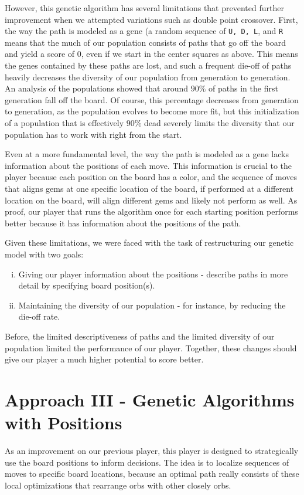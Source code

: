 \documentclass[journal,final,letterpaper,11pt]{IEEEtran}
\begin{document}
However, this genetic algorithm has several limitations that prevented further improvement when we attempted variations such as double point crossover. First, the way the path is modeled as a gene (a random sequence of \verb+U, D, L+, and \verb+R+ means that the much of our population consists of paths that go off the board and yield a score of 0, even if we start in the center squares as above. This means the genes contained by these paths are lost, and such a frequent die-off of paths heavily decreases the diversity of our population from generation to generation. An analysis of the populations showed that around $90\%$ of paths in the first generation fall off the board. Of course, this percentage decreases from generation to generation, as the population evolves to become more fit, but this initialization of a population that is effectively $90\%$ dead severely limits the diversity that our population has to work with right from the start.

Even at a more fundamental level, the way the path is modeled as a gene lacks information about the positions of each move. This information is crucial to the player because each position on the board has a color, and the sequence of moves that aligns gems at one specific location of the board, if performed at a different location on the board, will align different gems and likely not perform as well. As proof, our player that runs the algorithm once for each starting position performs better because it has information about the positions of the path. 

Given these limitations, we were faced with the task of restructuring our genetic model with two goals:
\begin{enumerate}[(i)]
\item Giving our player information about the positions - describe paths in more detail by specifying board position(s).
\item Maintaining the diversity of our population - for instance, by reducing the die-off rate.
\end{enumerate}

\noindent Before, the limited descriptiveness of paths and the limited diversity of our population limited the performance of our player. Together, these changes should give our player a much higher potential to score better.

\section{Approach III - Genetic Algorithms with Positions}
As an improvement on our previous player, this player is designed to strategically use the board positions to inform decisions. The idea is to localize sequences of moves to specific board locations, because an optimal path really consists of these local optimizations that rearrange orbs with other closely orbs.
\end{document}
